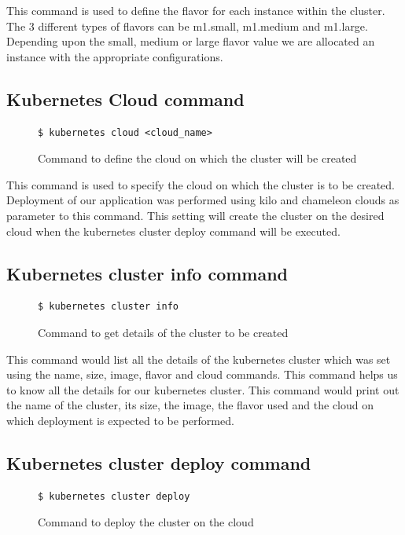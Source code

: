 \documentclass[9pt,twocolumn,twoside]{../../styles/osajnl}
\begin{document}
This command is used to define the flavor for each instance within the
cluster. The 3 different types of flavors can be m1.small, m1.medium
and m1.large. Depending upon the small, medium or large flavor value
we are allocated an instance with the appropriate configurations.

\subsection{Kubernetes Cloud command}
\begin{figure}[H]
\begin{verbatim}
$ kubernetes cloud <cloud_name>
\end{verbatim}
\caption{Command to define the cloud on which the cluster will be created}
\vspace{-4mm}
\label{Command to define the cloud}
\end{figure}

This command is used to specify the cloud on which the cluster is to
be created. Deployment of our application was performed using kilo
and chameleon clouds as parameter to this command. This setting will
create the cluster on the desired cloud when the kubernetes cluster
deploy command will be executed.

\subsection{Kubernetes cluster info command}

\begin{figure}[H]
\begin{verbatim}
$ kubernetes cluster info
\end{verbatim}
\caption{Command to get details of the cluster to be created}
\vspace{-4mm}
\label{Command to getthe details of the cluster to be created}
\end{figure}

This command would list all the details of the kubernetes cluster
which was set using the name, size, image, flavor and cloud
commands. This command helps us to know all the details for our
kubernetes cluster. This command would print out the name of the
cluster, its size, the image, the flavor used and the cloud on which
deployment is expected to be performed.

\subsection{Kubernetes cluster deploy command}
\begin{figure}[H]
\begin{verbatim}
$ kubernetes cluster deploy
\end{verbatim}
\caption{Command to deploy the cluster on the cloud}
\vspace{-4mm}
\label{Command to deploy the cluster on the cloud}
\end{figure}
\end{document}

